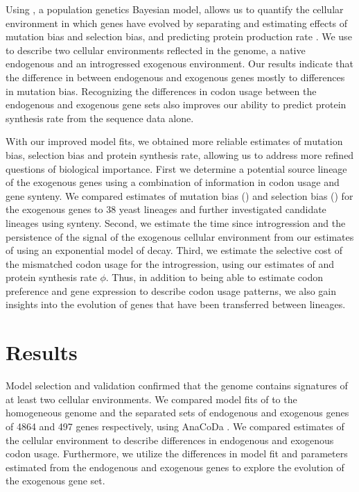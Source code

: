 \documentclass[12pt]{article}
\begin{document}
Using \ROC, a population genetics Bayesian model, allows us to quantify the cellular environment in which genes have evolved by separating and estimating effects of mutation bias and selection bias, and predicting protein production rate \citep{gilchrist2015}.
We use \ROC to describe two cellular environments reflected in the \kluyveri genome, a native endogenous and an introgressed exogenous environment.
Our results indicate that the difference in \GC between endogenous and exogenous genes mostly to differences in mutation bias.
Recognizing the differences in codon usage between the endogenous and exogenous gene sets also improves our ability to predict protein synthesis rate from the sequence data alone.

With our improved model fits, we obtained more reliable estimates of mutation bias, selection bias and protein synthesis rate, allowing us to address more refined questions of biological importance.
First we determine a potential source lineage of the exogenous genes using a combination of information in codon usage and gene synteny.
We compared estimates of mutation bias (\DM) and selection bias (\DE) for the exogenous genes to 38 yeast lineages and further investigated candidate lineages using synteny.
Second, we estimate the time since introgression and the persistence of the signal of the exogenous cellular environment from our estimates of \DM using an exponential model of decay.
Third, we estimate the selective cost of the mismatched codon usage for the introgression, using our estimates of \DE and protein synthesis rate $\phi$. 
Thus, in addition to being able to estimate codon preference and gene expression to describe codon usage patterns, we also gain insights into the evolution of genes that have been transferred between lineages.

\section*{Results}
Model selection and validation confirmed that the \kluyveri genome contains signatures of at least two cellular environments.
We compared model fits of \ROC to the homogeneous \kluyveri genome and the separated sets of endogenous and exogenous genes of 4864 and 497 genes respectively, using AnaCoDa \citep{landerer2018}.
We compared estimates of the cellular environment to describe differences in endogenous and exogenous codon usage.
Furthermore, we utilize the differences in model fit and parameters estimated from the endogenous and exogenous genes to explore the evolution of the exogenous gene set.
\end{document}
